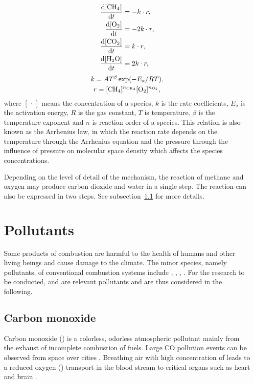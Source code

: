 \begin{subequations}
\begin{align}
    \frac{\mathrm d [\ce{CH4}]}{\mathrm d t} &= - k \cdot r, \\
    \frac{\mathrm d [\ce{O2}]}{\mathrm d t} &= - 2k \cdot r, \\
    \frac{\mathrm d [\ce{CO2}]}{\mathrm d t} &= k \cdot r, \\
    \frac{\mathrm d [\ce{H2O}]}{\mathrm d t} &= 2k \cdot r,
\end{align}
\end{subequations}
\begin{gather}
    k = A T^\beta \exp(- E_a / R T), \\
    r = [\ce{CH4}]^{n_{\ce{CH4}}} [\ce{O2}]^{n_{\ce{O2}}}, 
\end{gather}
where $[ \, \cdot \,]$ means the concentration of a species, $k$ is the rate coefficients, $E_a$ is the activation energy, $R$ is the gas constant, $T$ is temperature, $\beta$ is the temperature exponent and $n$ is reaction order of a species.  This relation is also known as the Arrhenius law, in which the reaction rate depends on the temperature through the Arrhenius equation and the pressure through the influence of pressure on molecular space density which affects the species concentrations. 

Depending on the level of detail of the mechanism, the reaction of methane and oxygen may produce carbon dioxide and water in a single step. The reaction can also be expressed in two steps. See subsection~\ref{subsec:CO} for more details. 

\section{Pollutants}

Some products of combustion are harmful to the health of humans and other living beings and cause damage to the climate. The minor species, namely pollutants, of conventional combustion systems include , , , . For the research to be conducted,  and  are relevant pollutants and are thus considered in the following.

\subsection{Carbon monoxide} \label{subsec:CO}

Carbon monoxide () is a colorless, odorless atmospheric pollutant mainly from the exhaust of incomplete combustion of fuels. Large CO pollution events can be observed from space over cities \parencite{COemmision}. Breathing air with high concentration of  leads to a reduced oxygen () transport in the blood stream to critical organs such as heart and brain \parencite{COpollution}.

